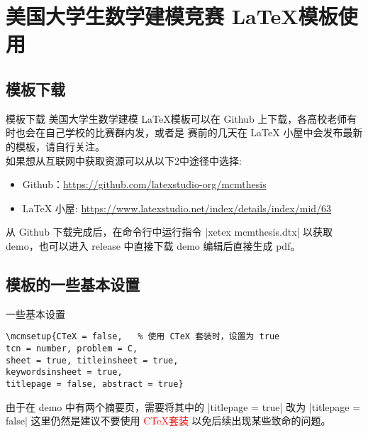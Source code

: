 \section{美国大学生数学建模竞赛 \LaTeX 模板使用}
\subsection{模板下载}
\begin{frame}{模板下载}
	美国大学生数学建模 \LaTeX 模板可以在 Github 上下载，各高校老师有时也会在自己学校的比赛群内发，或者是
	赛前的几天在 LaTeX 小屋中会发布最新的模板，请自行关注。\\
	如果想从互联网中获取资源可以从以下2中途径中选择:
	\begin{itemize}
		\item Github：\url{https://github.com/latexstudio-org/mcmthesis}
		\item LaTeX 小屋: \url{https://www.latexstudio.net/index/details/index/mid/63}		
	\end{itemize}
	从 Github 下载完成后，在命令行中运行指令 |xetex mcmthesis.dtx| 以获取 demo，也可以进入 release 中直接下载
	demo 编辑后直接生成 pdf。
\end{frame}

\subsection{模板的一些基本设置}
\begin{frame}[fragile]{一些基本设置}
\begin{lstlisting}
\mcmsetup{CTeX = false,   % 使用 CTeX 套装时，设置为 true
tcn = number, problem = C,
sheet = true, titleinsheet = true, 
keywordsinsheet = true,
titlepage = false, abstract = true}
\end{lstlisting}
由于在 demo 中有两个摘要页，需要将其中的 |titlepage = true| 改为 |titlepage = false|
这里仍然是建议不要使用 \textcolor{red}{CTeX套装} 以免后续出现某些致命的问题。 
\end{frame}